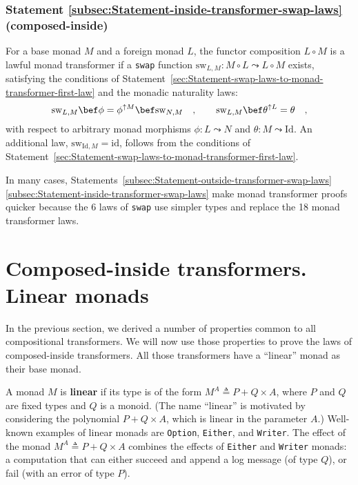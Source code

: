 \subsubsection{Statement \label{subsec:Statement-inside-transformer-swap-laws}\ref{subsec:Statement-inside-transformer-swap-laws}
(composed-inside)}

For a base monad $M$ and a foreign monad $L$, the functor composition
$L\circ M$ is a lawful monad transformer if a \lstinline!swap! function
$\text{sw}_{L,M}:M\circ L\leadsto L\circ M$ exists, satisfying the
conditions of Statement~\ref{sec:Statement-swap-laws-to-monad-transformer-first-law}
and the monadic naturality laws:
\[
\text{sw}_{L,M}\bef\phi=\phi^{\uparrow M}\bef\text{sw}_{N,M}\quad,\quad\quad\text{sw}_{L,M}\bef\theta^{\uparrow L}=\theta\quad,
\]
with respect to arbitrary monad morphisms $\phi:L\leadsto N$ and
$\theta:M\leadsto\text{Id}$. An additional law, $\text{sw}_{\text{Id},M}=\text{id}$,
follows from the conditions of Statement~\ref{sec:Statement-swap-laws-to-monad-transformer-first-law}.

In many cases, Statements~\ref{subsec:Statement-outside-transformer-swap-laws}\textendash \ref{subsec:Statement-inside-transformer-swap-laws}
make monad transformer proofs quicker because the 6 laws of \lstinline!swap!
use simpler types and replace the 18 monad transformer laws.

\section{Composed-inside transformers. Linear monads\label{sec:transformers-linear-monads}}

In the previous section, we derived a number of properties common
to all compositional transformers. We will now use those properties
to prove the laws of composed-inside transformers. All those transformers
have a \textsf{``}linear\textsf{''} monad as their base monad.

A monad $M$ is\textbf{ linear} if its type
is of the form $M^{A}\triangleq P+Q\times A$, where $P$ and $Q$
are fixed types and $Q$ is a monoid. (The name \textsf{``}linear\textsf{''} is motivated
by considering the polynomial $P+Q\times A$, which is linear in the
parameter $A$.) Well-known examples of linear monads are \lstinline!Option!,
\lstinline!Either!, and \lstinline!Writer!. The effect of the monad
$M^{A}\triangleq P+Q\times A$ combines the effects of \lstinline!Either!
and \lstinline!Writer! monads: a computation that can either succeed
and append a log message (of type $Q$), or fail (with an error of
type $P$).

